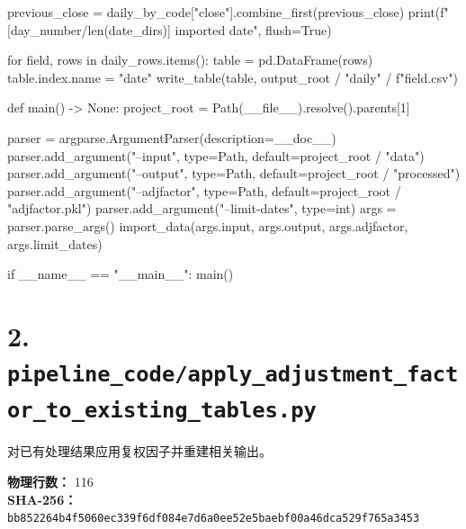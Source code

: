 \documentclass[UTF8,a4paper,fontset=fandol]{ctexart}
\begin{document}
\begin{ProjectCode}
        previous_close = daily_by_code["close"].combine_first(previous_close)
        print(f"[{day_number}/{len(date_dirs)}] imported {date}", flush=True)

    for field, rows in daily_rows.items():
        table = pd.DataFrame(rows)
        table.index.name = "date"
        write_table(table, output_root / "daily" / f"{field}.csv")


def main() -> None:
    project_root = Path(__file__).resolve().parents[1]

    parser = argparse.ArgumentParser(description=__doc__)
    parser.add_argument("--input", type=Path, default=project_root / "data")
    parser.add_argument("--output", type=Path, default=project_root / "processed")
    parser.add_argument("--adjfactor", type=Path, default=project_root / "adjfactor.pkl")
    parser.add_argument("--limit-dates", type=int)
    args = parser.parse_args()
    import_data(args.input, args.output, args.adjfactor, args.limit_dates)


if __name__ == "__main__":
    main()
\end{ProjectCode}
\clearpage
\section{2. \texttt{pipeline\_code/apply\_adjustment\_factor\_to\_existing\_tables.py}}
对已有处理结果应用复权因子并重建相关输出。

\textbf{物理行数：} 116\\
\textbf{SHA-256：} \texttt{bb852264b4f5060ec339f6df084e7d6a0ee52e5baebf00a46dca529f765a3453}
\end{document}
